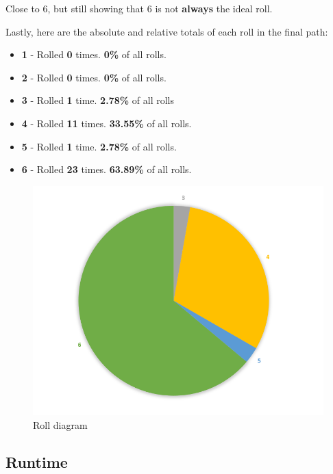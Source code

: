 \documentclass[12pt]{article}
\begin{document}
Close to 6, but still showing that 6 is not \textbf{always} the ideal roll.

\newpage

Lastly, here are the absolute and relative totals of each roll in the final path:

\begin{itemize}
    \item \textbf{1} - Rolled \textbf{0} times. \textbf{0\%} of all rolls.
    \item \textbf{2} - Rolled \textbf{0} times. \textbf{0\%} of all rolls.
    \item \textbf{3} - Rolled \textbf{1} time. \textbf{2.78\%} of all rolls
    \item \textbf{4} - Rolled \textbf{11} times. \textbf{33.55\%} of all rolls.
    \item \textbf{5} - Rolled \textbf{1} time. \textbf{2.78\%} of all rolls.
    \item \textbf{6} - Rolled \textbf{23} times. \textbf{63.89\%} of all rolls.
\end{itemize}

\begin{figure}[htbp]
    \centering
    \includegraphics[width=1\textwidth]{images/Figure13}
    \caption{Roll diagram}
    \label{fig:roll-diagram}
\end{figure}

\subsection{Runtime}
\end{document}
